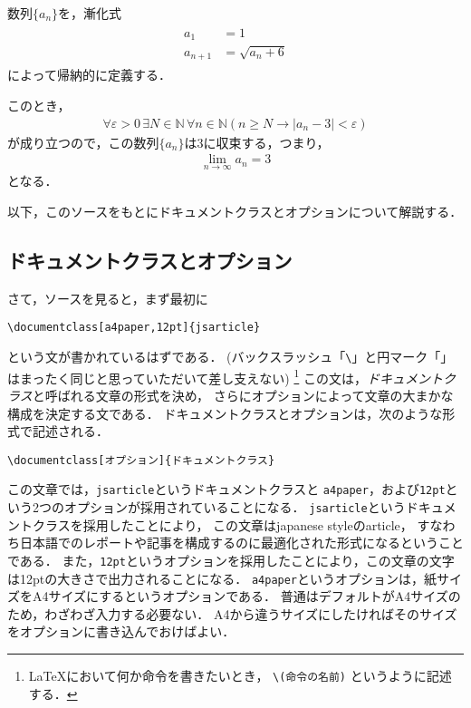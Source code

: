 \begin{oframed}
数列$\{ a_n \}$を，漸化式
\begin{align} 
 \begin{aligned}%
  a_1 & = 1 \\ %
  a _ {n+1} & = \sqrt{ a_n + 6} %
 \end{aligned}
\end{align} %
によって帰納的に定義する．


このとき，
\begin{align} 
\forall \varepsilon >0 \, \exists N \in \mathbb{N} \, 
\forall n \in \mathbb{N} 
( n \geq N \rightarrow \lvert a_n -3 \rvert < \varepsilon )
\end{align} 
が成り立つので，この数列$\{ a_n \}$は3に収束する，つまり，
\begin{align}
\lim_{n \to \infty} a_n = 3
\end{align}
となる．
\end{oframed}

以下，このソースをもとにドキュメントクラスとオプションについて解説する．
\subsection{ドキュメントクラスとオプション}
さて，ソースを見ると，まず最初に
\begin{verbatim}
\documentclass[a4paper,12pt]{jsarticle}
\end{verbatim}
という文が書かれているはずである．
(バックスラッシュ「\verb|\|」と円マーク「\texttt{{\yen}}」はまったく同じと思っていただいて差し支えない)
\footnote{
{\LaTeX}において何か命令を書きたいとき，
\verb|\(命令の名前)|
というように記述する．}
この文は，\emph{ドキュメントクラス}と呼ばれる文章の形式を決め，
さらにオプションによって文章の大まかな構成を決定する文である．
ドキュメントクラスとオプションは，次のような形式で記述される．
\begin{verbatim}
\documentclass[オプション]{ドキュメントクラス}
\end{verbatim}
この文章では，\verb|jsarticle|というドキュメントクラスと
\verb|a4paper|，および\verb|12pt|という2つのオプションが採用されていることになる．
\verb|jsarticle|というドキュメントクラスを採用したことにより，
この文章はjapanese styleのarticle，
すなわち日本語でのレポートや記事を構成するのに最適化された形式になるということである．
また，\verb|12pt|というオプションを採用したことにより，この文章の文字は12ptの大きさで出力されることになる．
\verb|a4paper|というオプションは，紙サイズをA4サイズにするというオプションである．
普通はデフォルトがA4サイズのため，わざわざ入力する必要ない．
A4から違うサイズにしたければそのサイズをオプションに書き込んでおけばよい．

